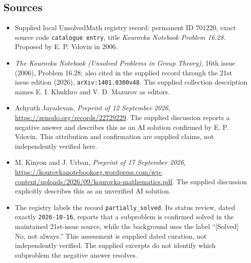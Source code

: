 \documentclass[11pt]{article}
\begin{document}
\subsection{Sources}
\begin{itemize}
\item Supplied local UnsolvedMath registry record: permanent ID \(701220\), exact source code \texttt{catalogue entry}, title \emph{Kourovka Notebook Problem 16.28}. Proposed by E. P. Vdovin in 2006.
\item \emph{The Kourovka Notebook (Unsolved Problems in Group Theory)}, 16th issue (2006), Problem 16.28; also cited in the supplied record through the 21st issue edition (2026), \texttt{arXiv:1401.0300v48}. The supplied collection description names E. I. Khukhro and V. D. Mazurov as editors.
\item Achyuth Jayadevan, \emph{Preprint of 12 September 2026}, \url{https://zenodo.org/records/22729229}. The supplied discussion reports a negative answer and describes this as an AI solution confirmed by E. P. Vdovin. This attribution and confirmation are supplied claims, not independently verified here.
\item M. Kinyon and J. Urban, \emph{Preprint of 17 September 2026}, \url{https://kourovkanotebookorg.wordpress.com/wp-content/uploads/2026/09/kourovka-mathematics.pdf}. The supplied discussion explicitly describes this as an unverified AI solution.
\item The registry labels the record \texttt{partially\_solved}. Its status review, dated exactly \texttt{2026-10-16}, reports that a subproblem is confirmed solved in the maintained 21st-issue source, while the background uses the label ``[Solved] No, not always.'' This assessment is supplied dated curation, not independently verified. The supplied excerpts do not identify which subproblem the negative answer resolves.
\end{itemize}
\end{document}
